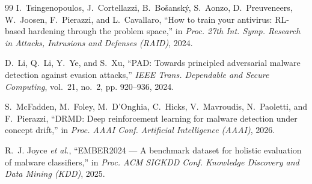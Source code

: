 \documentclass[conference]{IEEEtran}
\begin{document}
\begin{thebibliography}{99}
I.~Tsingenopoulos, J.~Cortellazzi, B.~Bo\v{s}ansk\'{y}, S.~Aonzo,
D.~Preuveneers, W.~Joosen, F.~Pierazzi, and L.~Cavallaro, ``How to train your
antivirus: RL-based hardening through the problem space,'' in \emph{Proc. 27th
Int. Symp. Research in Attacks, Intrusions and Defenses (RAID)}, 2024.

D.~Li, Q.~Li, Y.~Ye, and S.~Xu, ``PAD: Towards principled adversarial malware
detection against evasion attacks,'' \emph{IEEE Trans. Dependable and Secure
Computing}, vol.~21, no.~2, pp. 920--936, 2024.

S.~McFadden, M.~Foley, M.~D'Onghia, C.~Hicks, V.~Mavroudis, N.~Paoletti, and
F.~Pierazzi, ``DRMD: Deep reinforcement learning for malware detection under
concept drift,'' in \emph{Proc. AAAI Conf. Artificial Intelligence (AAAI)},
2026.

R.~J. Joyce \emph{et al.}, ``EMBER2024 --- A benchmark dataset for holistic
evaluation of malware classifiers,'' in \emph{Proc. ACM SIGKDD Conf. Knowledge
Discovery and Data Mining (KDD)}, 2025.

\end{thebibliography}

\balance
\end{document}
